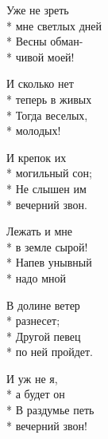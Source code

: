 \medskip

\begin{minipage}{\linewidth}
Уже не зреть\\*
мне светлых дней\\*
Весны обман-\\*
чивой моей!\\
\end{minipage}\par\medskip\nobreak

\medskip

\begin{minipage}{\linewidth}
И сколько нет\\*
теперь в живых\\*
Тогда веселых,\\*
молодых!\\
\end{minipage}\par\medskip\nobreak

\medskip

\begin{minipage}{\linewidth}
И крепок их\\*
могильный сон;\\*
Не слышен им\\*
вечерний звон.\\
\end{minipage}\par\medskip\nobreak

\medskip

\begin{minipage}{\linewidth}
Лежать и мне\\*
в земле сырой!\\*
Напев унывный\\*
надо мной\\
\end{minipage}\par\medskip\nobreak

\medskip

\begin{minipage}{\linewidth}
В долине ветер\\*
разнесет;\\*
Другой певец\\*
по ней пройдет.\\
\end{minipage}\par\medskip\nobreak

\medskip

\begin{minipage}{\linewidth}
И уж не я,\\*
а будет он\\*
В раздумье петь\\*
вечерний звон!\\
\end{minipage}\par\medskip\nobreak


